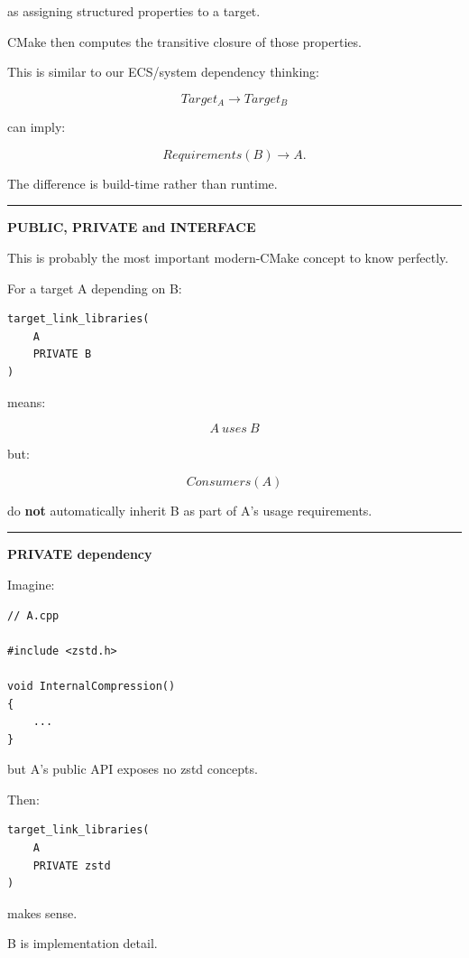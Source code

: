 as assigning structured properties to a target.

CMake then computes the transitive closure of those properties.

This is similar to our ECS/system dependency thinking:

\[
Target_A
\rightarrow
Target_B
\]

can imply:

\[
Requirements(B)
\rightarrow
A.
\]

The difference is build-time rather than runtime.

\begin{center}\rule{0.5\linewidth}{0.5pt}\end{center}

\textbf{PUBLIC, PRIVATE and INTERFACE}

This is probably the most important modern-CMake concept to know perfectly.

For a target A depending on B:

\begin{verbatim}
target_link_libraries(
    A
    PRIVATE B
)
\end{verbatim}

means:

\[
A\ uses\ B
\]

but:

\[
Consumers(A)
\]

do \textbf{not} automatically inherit B as part of A's usage requirements.

\begin{center}\rule{0.5\linewidth}{0.5pt}\end{center}

\textbf{PRIVATE dependency}

Imagine:

\begin{verbatim}
// A.cpp

#include <zstd.h>

void InternalCompression()
{
    ...
}
\end{verbatim}

but A's public API exposes no zstd concepts.

Then:

\begin{verbatim}
target_link_libraries(
    A
    PRIVATE zstd
)
\end{verbatim}

makes sense.

B is implementation detail.

